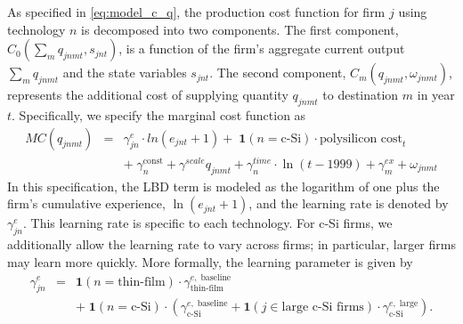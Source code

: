 \documentclass[12pt]{article}
\begin{document}
As specified in \eqref{eq:model_c_q}, the production cost function for firm $j$ using technology $n$ is decomposed into two components. The first component, $C_0\!\left(\sum_m q_{jnmt},s_{jnt}\right)$, is a function of the firm’s aggregate current output $\sum_m q_{jnmt}$ and the state variables $s_{jnt}$. The second component, $C_m(q_{jnmt},\omega_{jnmt})$, represents the additional cost of supplying quantity $q_{jnmt}$ to destination $m$ in year $t$.
Specifically, we specify the marginal cost function as
\begin{eqnarray}
  MC(q_{jnmt}) &=& \gamma^{e}_{jn} \cdot ln(e_{jnt}+1) + \; \mathbf{1}(n = \text{c-Si}) \cdot \text{polysilicon cost}_t  \nonumber \\
  & & + \;  \gamma_{n}^{\text{const}} + \gamma^{scale} q_{jnmt} +  \gamma^{time}_n \cdot\ln(t-1999)+\gamma_{m}^{ex}  + \omega_{jnmt} \label{eq:est_mc_q}
\end{eqnarray}
In this specification, the LBD term is modeled as the logarithm of one plus the firm’s cumulative experience, $ \ln(e_{jnt}+1) $, and the learning rate is denoted by $\gamma^{e}_{jn}$. This learning rate is specific to each technology. For c-Si firms, we additionally allow the learning rate to vary across firms; in particular, larger firms may learn more quickly.  More formally, the learning parameter is given by
\begin{eqnarray*}
\gamma^{e}_{jn} & = & \mathbf{1}(n = \text{thin-film}) \cdot \gamma^{e,\;\text{baseline}}_{\text{thin-film}} \nonumber \\
& & + \; \mathbf{1}(n = \text{c-Si}) \cdot (\gamma^{e,\;\text{baseline}}_{\text{c-Si}} + \mathbf{1}(j \in \text{large c-Si firms})\cdot \gamma^{e,\;\text{large}}_{\text{c-Si}}).
\end{eqnarray*}
\end{document}
